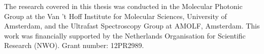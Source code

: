 \vspace{0.5cm}

\noindent The research covered in this thesis was conducted in the Molecular Photonic Group at the Van 't Hoff Institute for Molecular Sciences, University of Amsterdam, and the Ultrafast Spectroscopy Group at AMOLF, Amsterdam. This work was financially supported by the Netherlands Organisation for Scientific Research (NWO). Grant number: 12PR2989.


\vspace*{\fill}

